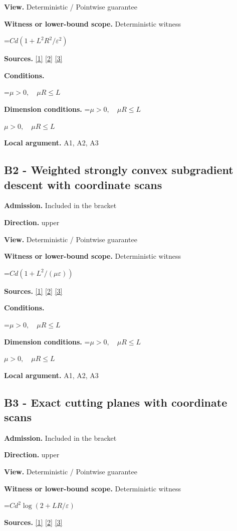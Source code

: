 \documentclass[10pt,a4paper]{article}
\newcommand{\AtlasMath}[1]{\par\begingroup\centering\setbox0=\hbox{$\displaystyle #1$}\ifdim\wd0>1.4\linewidth\typeout{ATLAS WIDE FORMULA: \the\wd0}\fi\ifdim\wd0>\linewidth\resizebox{\linewidth}{!}{\box0}\else\box0\fi\par\endgroup}
\newcommand{\AtlasInlineMath}[1]{\begingroup\setbox0=\hbox{$#1$}\ifdim\wd0>.4\linewidth\endgroup\AtlasMath{#1}\else\endgroup$#1$\fi}
\begin{document}
\textbf{View.} Deterministic / Pointwise guarantee

\textbf{Witness or lower-bound scope.} Deterministic witness

\AtlasMath{Cd(1+L^2R^2/\varepsilon^2)}
\textbf{Sources.} \href{https://arxiv.org/pdf/1405.4980}{[1]} \href{https://www2.isye.gatech.edu/~nemirovs/MOR_AccuracyCertificates.pdf}{[2]} \href{https://arxiv.org/pdf/2609.20701}{[3]}

\textbf{Conditions.} 
\AtlasMath{\mu>0,\quad\mu R\le L}


\textbf{Dimension conditions.} \AtlasInlineMath{\mu>0,\quad\mu R\le L}

\textbf{Local argument.} A1, A2, A3

\subsection{B2 - Weighted strongly convex subgradient descent with coordinate scans}
\textbf{Admission.} Included in the bracket

\textbf{Direction.} upper

\textbf{View.} Deterministic / Pointwise guarantee

\textbf{Witness or lower-bound scope.} Deterministic witness

\AtlasMath{Cd(1+L^2/(\mu\varepsilon))}
\textbf{Sources.} \href{https://arxiv.org/pdf/1405.4980}{[1]} \href{https://www2.isye.gatech.edu/~nemirovs/MOR_AccuracyCertificates.pdf}{[2]} \href{https://arxiv.org/pdf/2609.20701}{[3]}

\textbf{Conditions.} 
\AtlasMath{\mu>0,\quad\mu R\le L}


\textbf{Dimension conditions.} \AtlasInlineMath{\mu>0,\quad\mu R\le L}

\textbf{Local argument.} A1, A2, A3

\subsection{B3 - Exact cutting planes with coordinate scans}
\textbf{Admission.} Included in the bracket

\textbf{Direction.} upper

\textbf{View.} Deterministic / Pointwise guarantee

\textbf{Witness or lower-bound scope.} Deterministic witness

\AtlasMath{Cd^2\log(2+LR/\varepsilon)}
\textbf{Sources.} \href{https://arxiv.org/pdf/1405.4980}{[1]} \href{https://www2.isye.gatech.edu/~nemirovs/MOR_AccuracyCertificates.pdf}{[2]} \href{https://arxiv.org/pdf/2609.20701}{[3]}
\end{document}

